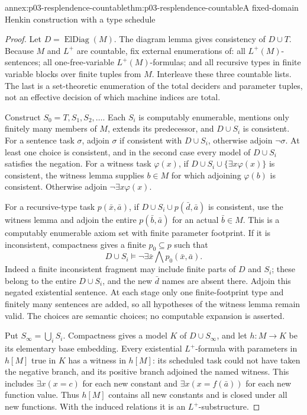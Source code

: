 \begin{annexitem}{annex:p03-resplendence-countable}{thm:p03-resplendence-countable}{A fixed-domain Henkin construction with a type schedule}
\begin{proof}
Let \(D=\operatorname{ElDiag}(M)\). The diagram lemma gives consistency
of \(D\cup T\). Because \(M\) and \(L^+\) are countable, fix external
enumerations of: all \(L^+(M)\)-sentences; all one-free-variable
\(L^+(M)\)-formulas; and all recursive types in finite variable blocks
over finite tuples from \(M\). Interleave these three countable lists.
The last is a set-theoretic enumeration of the total deciders and parameter
tuples, not an effective decision of which machine indices are total.

Construct \(S_0=T,S_1,S_2,\ldots\). Each \(S_i\) is computably
enumerable, mentions only finitely many members of \(M\), extends its
predecessor, and \(D\cup S_i\) is consistent. For a sentence task
\(\sigma\), adjoin \(\sigma\) if consistent with \(D\cup S_i\),
otherwise adjoin \(\neg\sigma\). At least one choice is consistent,
and in the second case every model of \(D\cup S_i\) satisfies the
negation. For a witness task \(\varphi(x)\), if
\(D\cup S_i\cup\{\exists x\varphi(x)\}\) is consistent, the witness
lemma supplies \(b\in M\) for which adjoining \(\varphi(b)\) is
consistent. Otherwise adjoin \(\neg\exists x\varphi(x)\).

For a recursive-type task \(p(\bar x,\bar a)\), if
\(D\cup S_i\cup p(\bar d,\bar a)\) is consistent, use the witness
lemma and adjoin the entire \(p(\bar b,\bar a)\) for an actual
\(\bar b\in M\). This is a computably enumerable axiom set with
finite parameter footprint. If it is inconsistent, compactness gives a
finite \(p_0\subseteq p\) such that
\[
 D\cup S_i\models\neg\exists\bar x\bigwedge p_0(\bar x,\bar a).
\]
Indeed a finite inconsistent fragment may include finite parts of \(D\)
and \(S_i\); these belong to the entire \(D\cup S_i\), and the new
\(\bar d\) names are absent there. Adjoin this negated existential
sentence. At each stage only one finite-footprint type and finitely many
sentences are added, so all hypotheses of the witness lemma remain valid.
The choices are semantic choices; no computable expansion is asserted.

Put \(S_\infty=\bigcup_iS_i\). Compactness gives a model \(K\) of
\(D\cup S_\infty\), and let \(h:M\to K\) be its elementary base
embedding. Every existential \(L^+\)-formula with parameters in
\(h[M]\) true in \(K\) has a witness in \(h[M]\): its scheduled task
could not have taken the negative branch, and its positive branch adjoined
the named witness. This includes \(\exists x(x=c)\) for each new
constant and \(\exists x(x=f(\bar a))\) for each new function value.
Thus \(h[M]\) contains all new constants and is closed under all new
functions. With the induced relations it is an \(L^+\)-substructure.


\end{proof}
\end{annexitem}
